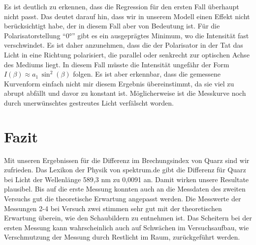 \documentclass[a4paper, 12pt,]{scrartcl}
\begin{document}
Es ist deutlich zu erkennen, dass die Regression für den ersten Fall überhaupt nicht passt. Das deutet darauf hin, dass wir in unserem Modell einen Effekt nicht berücksichtigt habe, der in diesem Fall aber von Bedeutung ist. Für die Polarisatorstellung ``0°'' gibt es ein ausgeprägtes Minimum, wo die Intensität fast verschwindet. Es ist daher anzunehmen, dass die der Polarisator in der Tat das Licht in eine Richtung polarisiert, die parallel oder senkrecht zur optischen Achse des Mediums liegt. In diesem Fall müsste die Intensität ungefähr der Form $I(\beta)\approx{a_1}\,\sin^2(\beta)$ folgen. Es ist aber erkennbar, dass die gemessene Kurvenform einfach nicht mir diesem Ergebnis übereinstimmt, da sie viel zu abrupt abfällt und davor zu konstant ist. Möglicherweise ist die Messkurve noch durch unerwünschtes gestreutes Licht verfälscht worden.

\section{Fazit}
Mit unseren Ergebnissen für die Differenz im Brechungsindex von Quarz sind wir zufrieden. Das Lexikon der Physik von spektrum.de gibt die Differenz für Quarz bei Licht der Wellenlänge 589,3 nm zu 0,0091 an. Damit wirken unsere Resultate plausibel. Bis auf die erste Messung konnten auch an die Messdaten des zweiten Versuchs gut die theoretische Erwartung angepasst werden. Die Messwerte der Messungen 2-4 bei Versuch zwei stimmen sehr gut mit der theoretischen Erwartung überein, wie den Schaubildern zu entnehmen ist. Das Scheitern bei der ersten Messung kann wahrscheinlich auch auf Schwächen im Versuchsaufbau, wie Verschmutzung der Messung durch Restlicht im Raum, zurückgeführt werden. 
\end{document}
